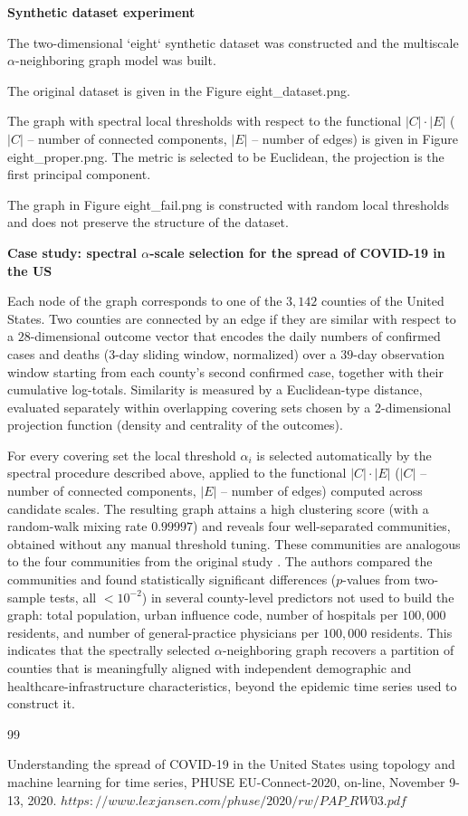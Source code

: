 \documentclass[12pt,a4]{article}
\begin{document}
\bigskip
\textbf{Synthetic dataset experiment}

The two-dimensional `eight` synthetic dataset was constructed and the multiscale $\alpha $-neighboring graph model was built.

The original dataset is given in the Figure  eight\_dataset.png. 

The graph with spectral local thresholds with respect to the functional $|C|\cdot|E|$ ($|C|$ -- number of connected components, $|E|$ -- number of edges) is given in Figure eight\_proper.png. The metric is selected to be Euclidean, the projection is the first principal component.

The graph in Figure eight\_fail.png is constructed with random local thresholds and does not preserve the structure of the dataset. 


\bigskip
\textbf{Case study: spectral $\alpha$-scale selection for the spread of COVID-19 in the US}



Each node of the graph corresponds to one of the $3{,}142$ counties of the United States. Two counties are connected by an edge if they are similar with respect to a $28$-dimensional outcome vector that encodes the daily numbers of confirmed cases and deaths (3-day sliding window, normalized) over a $39$-day observation window starting from each county's second confirmed case, together with their cumulative log-totals. Similarity is measured by a Euclidean-type distance, evaluated separately within overlapping covering sets chosen by a 2-dimensional projection function (density and centrality of the outcomes).



For every covering set the local threshold $\alpha _{i}$ is selected automatically by the spectral procedure described above, applied to the functional $|C|\cdot|E|$ ($|C|$ -- number of connected components, $|E|$ -- number of edges) computed across candidate scales. The resulting graph attains a high clustering score (with a random-walk mixing rate $0.99997$) and reveals four well-separated communities, obtained without any manual threshold tuning. These communities are analogous to the four communities from the original study \cite{COVID-19}. The authors compared the communities and found statistically significant differences ($p$-values from two-sample tests, all $<10^{-2}$) in several county-level predictors not used to build the graph: total population, urban influence code, number of hospitals per $100{,}000$ residents, and number of general-practice physicians per $100{,}000$ residents. This indicates that the spectrally selected $\alpha$-neighboring graph recovers a partition of counties that is meaningfully aligned with independent demographic and healthcare-infrastructure characteristics, beyond the epidemic time series used to construct it.

\begin{thebibliography}{99}
	
	 Understanding the spread of COVID-19 in the United States using topology and machine learning for time series, PHUSE EU-Connect-2020, on-line, November 9-13, 2020. ${https://www.lexjansen.com/phuse/2020/rw/PAP \_ RW03.pdf}$
	
\end{thebibliography}
\end{document}
